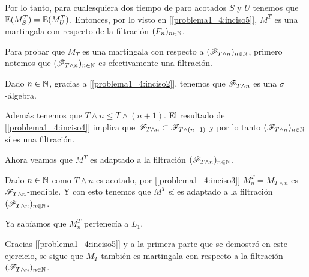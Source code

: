 	Por lo tanto, para cualesquiera dos tiempo de paro acotados $S$ y $U$ tenemos que $\mathbb{E}(M_S^T) = \mathbb{E}(M_U^T)$.
	Entonces, por lo visto en [\ref{problema1_4:inciso5}], $M^T$ es una martingala con respecto de la filtración
	$(F_n)_{n \in \mathbb{N}}$.\par\null
	
	Para probar que $M_T$ es una martingala con respecto a $(\mathscr{F}_{T \wedge n})_{n \in \mathbb{N}}$, primero notemos que
	$(\mathscr{F}_{T \wedge n})_{n \in \mathbb{N}}$ es efectivamente una filtración.\par\null
	
	Dado $n \in \mathbb{N}$, gracias a [\ref{problema1_4:inciso2}], tenemos que $\mathscr{F}_{T \wedge n}$ es una $\sigma$-álgebra.\par\null

	Además tenemos que $T \wedge n \leq T \wedge (n+1)$. El resultado de [\ref{problema1_4:inciso4}] implica que 
	$\mathscr{F}_{T \wedge n} \subset \mathscr{F}_{T \wedge (n+1)}$ y por lo tanto $(\mathscr{F}_{T \wedge n})_{n \in \mathbb{N}}$ sí es una filtración.\par\null
	
	Ahora veamos que $M^T$ es adaptado a la filtración $(\mathscr{F}_{T \wedge n})_{n \in \mathbb{N}}$.\par\null

	Dado $n \in \mathbb{N}$ como $T \wedge n$ es acotado, por [\ref{problema1_4:inciso3}] $M_n^T = M_{T \wedge n}$ es $\mathscr{F}_{T \wedge n}$-medible.
	Y con esto tenemos que $M^T$ sí es adaptado a la filtración $(\mathscr{F}_{T \wedge n})_{n \in \mathbb{N}}$.\par\null
	
	Ya sabíamos que $M_n^T$ pertenecía a $L_1$.\par\null
	
	Gracias [\ref{problema1_4:inciso5}] y a la primera parte que se demostró en este ejercicio, se sigue que $M_T$ también es
	martingala con respecto a la filtración $(\mathscr{F}_{T \wedge n})_{n \in \mathbb{N}}$.